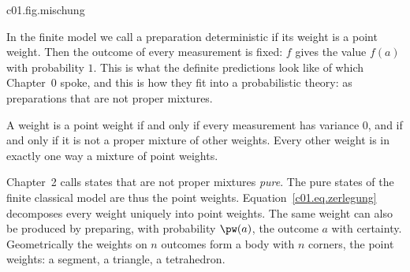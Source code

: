 \begin{tpcfigure}{c01.fig.mischung}

  \caption{The construction of equation~\eqref{c01.eq.echte-mischung} for the loaded
    die $\pw$ of equation~\eqref{c01.eq.gezinkt}, with $a = 6$, $b = 1$ and
    $\varepsilon = \tfrac{1}{12}$. Starting from $\pw$ (left), the weight $\tfrac{1}{12}$ is
    moved once from $1$ to $6$ (middle, $q$) and once from $6$ to $1$ (right, $r$); the
    changed bars are hatched. Here $r$ is the fair die. The loaded die is the mixture
    $\pw = \tfrac12 q + \tfrac12 r$ and therefore not a point weight.}
\end{tpcfigure}

In the finite model we call a preparation deterministic if its weight is a point weight.
Then the outcome of every measurement is fixed: $f$ gives the value $f(a)$ with probability
$1$. This is what the definite predictions look like of which Chapter~0 spoke, and this
is how they fit into a probabilistic theory: as preparations that are not proper mixtures.

\begin{merksatz}
  A weight is a point weight if and only if every measurement has variance $0$, and if and
  only if it is not a proper mixture of other weights. Every other weight is in exactly
  one way a mixture of point weights.
\end{merksatz}

Chapter~2 calls states that are not proper mixtures \emph{pure}. The pure states of the
finite classical model are thus the point weights.
Equation~\eqref{c01.eq.zerlegung} decomposes every weight uniquely into point weights.
The same weight can also be produced by preparing, with probability $\pw(a)$, the outcome
$a$ with certainty.
Geometrically the weights on $n$ outcomes form a body with $n$ corners, the point weights:
a segment, a triangle, a tetrahedron.

